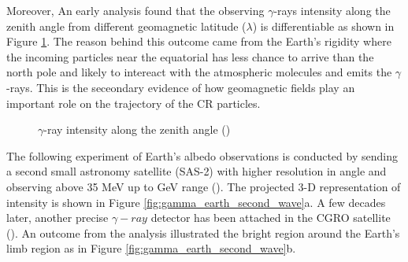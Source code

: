 Moreover, An early analysis found 
that the observing $\gamma$-rays intensity along the zenith angle
from different geomagnetic latitude ($\lambda$) is differentiable
as shown in Figure \ref{fig:explorer_xi_zenith}. The reason behind 
this outcome came from the Earth's rigidity where the incoming 
particles near the equatorial has less chance to arrive than the 
north pole and likely to intereact with the atmospheric molecules 
and emits the $\gamma$-rays. This is the seceondary 
evidence of how geomagnetic fields play an important role on the 
trajectory of the CR particles. 

\begin{figure}[h!]
    \centering
        \hfill
        \caption{
            $\gamma$-ray intensity along the zenith angle
            (\cite{kraushaar1965explorer})  
        }
       \label{fig:explorer_xi_zenith}
\end{figure}

The following experiment of Earth's albedo observations is conducted 
by sending a second small astronomy satellite (SAS-2) with higher 
resolution in angle and observing above 35 MeV up to GeV range
(\cite{Thompson81}). The projected 3-D representation of intensity
is shown in Figure \ref{fig:gamma_earth_second_wave}a. A few decades 
later, another precise $\gamma-ray$ detector has been attached in the 
CGRO satellite (\cite{Petry05}). An outcome from the analysis 
illustrated the bright region around the Earth's limb region as 
in Figure \ref{fig:gamma_earth_second_wave}b.


